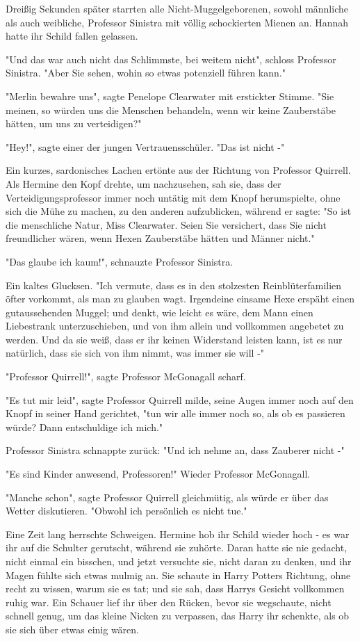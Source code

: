 {Dreißig Sekunden später starrten alle Nicht-Muggelgeborenen, sowohl männliche als auch weibliche, Professor Sinistra mit völlig schockierten Mienen an. Hannah hatte ihr Schild fallen gelassen.

"Und das war auch nicht das Schlimmste, bei weitem nicht", schloss Professor Sinistra. "Aber Sie sehen, wohin so etwas potenziell führen kann."

"Merlin bewahre uns", sagte Penelope Clearwater mit erstickter Stimme. "Sie meinen, so würden uns die Menschen behandeln, wenn wir keine Zauberstäbe hätten, um uns zu verteidigen?"

"Hey!", sagte einer der jungen Vertrauensschüler. "Das ist nicht -"

Ein kurzes, sardonisches Lachen ertönte aus der Richtung von Professor Quirrell. Als Hermine den Kopf drehte, um nachzusehen, sah sie, dass der Verteidigungsprofessor immer noch untätig mit dem Knopf herumspielte, ohne sich die Mühe zu machen, zu den anderen aufzublicken, während er sagte: "So ist die menschliche Natur, Miss Clearwater. Seien Sie versichert, dass Sie nicht freundlicher wären, wenn Hexen Zauberstäbe hätten und Männer nicht."

"Das glaube ich kaum!", schnauzte Professor Sinistra.

Ein kaltes Glucksen. "Ich vermute, dass es in den stolzesten Reinblüterfamilien öfter vorkommt, als man zu glauben wagt. Irgendeine einsame Hexe erspäht einen gutaussehenden Muggel; und denkt, wie leicht es wäre, dem Mann einen Liebestrank unterzuschieben, und von ihm allein und vollkommen angebetet zu werden. Und da sie weiß, dass er ihr keinen Widerstand leisten kann, ist es nur natürlich, dass sie sich von ihm nimmt, was immer sie will -"

"Professor Quirrell!", sagte Professor McGonagall scharf.

"Es tut mir leid", sagte Professor Quirrell milde, seine Augen immer noch auf den Knopf in seiner Hand gerichtet, "tun wir alle immer noch so, als ob es passieren würde? Dann entschuldige ich mich."

Professor Sinistra schnappte zurück: "Und ich nehme an, dass Zauberer nicht -"

"Es sind Kinder anwesend, Professoren!" Wieder Professor McGonagall.

"Manche schon", sagte Professor Quirrell gleichmütig, als würde er über das Wetter diskutieren. "Obwohl ich persönlich es nicht tue."

Eine Zeit lang herrschte Schweigen. Hermine hob ihr Schild wieder hoch - es war ihr auf die Schulter gerutscht, während sie zuhörte. Daran hatte sie nie gedacht, nicht einmal ein bisschen, und jetzt versuchte sie, nicht daran zu denken, und ihr Magen fühlte sich etwas mulmig an. Sie schaute in Harry Potters Richtung, ohne recht zu wissen, warum sie es tat; und sie sah, dass Harrys Gesicht vollkommen ruhig war. Ein Schauer lief ihr über den Rücken, bevor sie wegschaute, nicht schnell genug, um das kleine Nicken zu verpassen, das Harry ihr schenkte, als ob sie sich über etwas einig wären.

}
